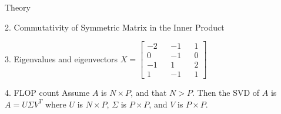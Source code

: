 \begin{section}{Theory}
\begin{homeworkSection}{2. Commutativity of Symmetric Matrix in the Inner Product}
\end{homeworkSection}


\begin{homeworkSection}{3. Eigenvalues and eigenvectors}
$ X = \begin{bmatrix} -2 && -1 && 1 \\ 0 && -1 && 0 \\ -1 && 1 && 2 \\ 1 && -1 && 1
\end{bmatrix} $
\end{homeworkSection}


\begin{homeworkSection}{4. FLOP count}
Assume $A$ is $N \times P$, and that $N > P$. Then the SVD of $A$ is $A=U \Sigma V^T$ where $U$ is $N \times P$, $\Sigma$ is $P\times P$, and $V$ is $P\times P$.


\end{homeworkSection}
\end{section}
